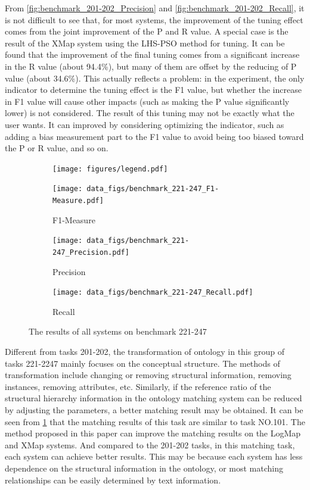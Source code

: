 \documentclass[twoside]{article}
\begin{document}
From \ref{fig:benchmark_201-202_Precision} and \ref{fig:benchmark_201-202_Recall}, it is not difficult to see that, for most systems, the improvement of the tuning effect comes from the joint improvement of the P and R value.
A special case is the result of the XMap system using the LHS-PSO method for tuning. It can be found that the improvement of the final tuning comes from a significant increase in the R value (about 94.4\%), but many of them are offset by the reducing of P value (about 34.6\%).
This actually reflects a problem: in the experiment, the only indicator to determine the tuning effect is the F1 value, but whether the increase in F1 value will cause other impacts (such as making the P value significantly lower) is not considered. The result of this tuning may not be exactly what the user wants.
It can improved by considering optimizing the indicator, such as adding a bias measurement part to the F1 value to avoid being too biased toward the P or R value, and so on.

\begin{figure}[htb!]\centering
\begin{subfigure}{\textwidth}
	\centering
\texttt{[image: figures/legend.pdf]}
\end{subfigure}
\begin{subfigure}{0.3\textwidth}
	\centering
\texttt{[image: data\_figs/benchmark\_221-247\_F1-Measure.pdf]}
\caption{F1-Measure}
\label{fig:benchmark_221-247_F1-Measure}
\end{subfigure}
\begin{subfigure}{0.3\textwidth}
	\centering
\texttt{[image: data\_figs/benchmark\_221-247\_Precision.pdf]}
\caption{Precision}
\label{fig:benchmark_221-247_Precision}
\end{subfigure}
\begin{subfigure}{0.3\textwidth}
	\centering
\texttt{[image: data\_figs/benchmark\_221-247\_Recall.pdf]}
\caption{Recall}
\label{fig:benchmark_221-247_Recall}
\end{subfigure}
\caption{The results of all systems on benchmark 221-247}
\end{figure}

Different from tasks 201-202, the transformation of ontology in this group of tasks 221-2247 mainly focuses on the conceptual structure. The methods of transformation include changing or removing structural information, removing instances, removing attributes, etc.
Similarly, if the reference ratio of the structural hierarchy information in the ontology matching system can be reduced by adjusting the parameters, a better matching result may be obtained.
It can be seen from \ref{fig:benchmark_221-247_F1-Measure} that the matching results of this task are similar to task NO.101. The method proposed in this paper can improve the matching results on the LogMap and XMap systems.
And compared to the 201-202 tasks, in this matching task, each system can achieve better results. This may be because each system has less dependence on the structural information in the ontology, or most matching relationships can be easily determined by text information.
\end{document}
